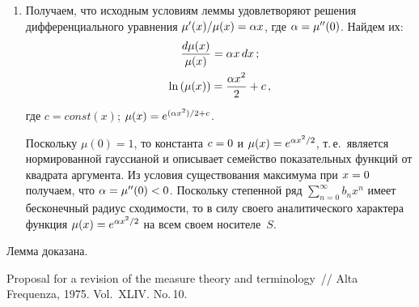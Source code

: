 \begin{multicols}{2}
{\begin{enumerate}[1.]
  Значит, 
  \begin{multline*}
  q_{n+2}= \fr{\mu^{(n+3)}(0)}{(n+2)!}- \mu^{\prime\prime}(0)
  \fr{\mu^{(n+1)}(0)}{(n+1)!}={}\\
  {}= \fr{{\mu^{\prime\prime}}^{(n+1)/2+1}(0)}{(n+2)!} 
\prod\limits_{j=0}^{(n+1)/2}(2j+1)- {}\\
{}-
\fr{{\mu^{\prime\prime}}^{(n+1)/2+1}(0)}{(n+1)!} \prod\limits_{j=0}^{(n-1)/2} 
(2j+1) ={}\\
  {}= \left( 2\fr{n+1}{2}+1\right) 
\fr{{\mu^{\prime\prime}}^{(n+1)/2+1}(0)}{(n+2)!} \prod\limits_{j=0}^{(n-1)/2} 
(2j+1)-{}\\
{}- \fr{{\mu^{\prime\prime}}^{(n+1)/2+1}(0)}{(n+1)!} 
  \prod\limits_{j=0}^{(n-1)/2} (2j+1)=0\,.
  \end{multline*}
  Таким образом, методом математической индукции показано, что все 
коэффициенты~$q_n$ разложения в ряд Маклорена функции $h(x)\hm= 
\mu^\prime(x)/\mu(x)$ с индексами $n\hm\geq 2$ будут нулевыми.
  \item  Получаем, что исходным условиям леммы удовле\-тво\-ря\-ют решения 
дифференциального уравнения $\mu^\prime(x)/\mu(x)\hm=\alpha x$, где 
$\alpha\hm= \mu^{\prime\prime}(0)$. Найдем их:
  \begin{gather*}
  \displaystyle\frac{\displaystyle d\mu(x)\mathstrut}{\displaystyle \mu(x)\mathstrut}=\alpha x \,dx\,;\\
  \ln \left( \mu(x)\right) =\displaystyle\frac{\displaystyle \alpha x^2\mathstrut}{\displaystyle 2\mathstrut}+c\,,
  \end{gather*}
  где $c=const(x)$;  $\mu(x)\hm= e^{(\alpha x^2)/2+c}$.

     
     Поскольку $\mu(0)=1$, то константа $c\hm=0$ и $\mu(x)\hm= e^{\alpha 
x^2/2}$, т.\,е.\ является нормированной гауссианой и описывает семейство 
показательных функций от квадрата аргумента. Из условия существования 
максимума при $x\hm=0$ получаем, что 
$\alpha\hm=\mu^{\prime\prime}(0)\hm<0$. Поскольку степенной ряд 
$\sum\limits_{n=0}^\infty b_n x^n$ имеет бесконечный радиус схо\-ди\-мости, то в 
силу своего аналитического характера функция $\mu(x)\hm= e^{\alpha x^2/2}$ 
на всем своем носителе~$S$.
     \end{enumerate}
     
  Лемма доказана.
  
  }
  
  {\small\frenchspacing
{%
\begin{thebibliography}{99}
    

Proposal for a revision of the measure theory and terminology~// Alta Frequenza, 
1975. Vol.~XLIV. No.\,10.


\end{thebibliography}}}
\end{multicols}
